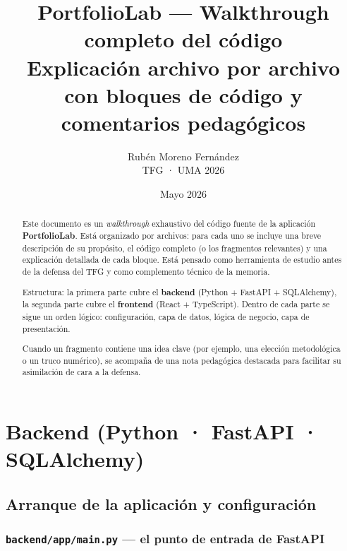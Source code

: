 \documentclass[11pt,a4paper]{book}
\title{\textbf{PortfolioLab — Walkthrough completo del código}\\[0.4em]
       \large Explicación archivo por archivo\\
       \small con bloques de código y comentarios pedagógicos}
\author{Rubén Moreno Fernández\\\small TFG · UMA 2026}
\date{Mayo 2026}
\begin{document}
\frontmatter
\maketitle

\begin{abstract}
\noindent Este documento es un \emph{walkthrough} exhaustivo del código fuente de la aplicación \textbf{PortfolioLab}. Está organizado por archivos: para cada uno se incluye una breve descripción de su propósito, el código completo (o los fragmentos relevantes) y una explicación detallada de cada bloque. Está pensado como herramienta de estudio antes de la defensa del TFG y como complemento técnico de la memoria.

\medskip

Estructura: la primera parte cubre el \textbf{backend} (Python + FastAPI + SQLAlchemy), la segunda parte cubre el \textbf{frontend} (React + TypeScript). Dentro de cada parte se sigue un orden lógico: configuración, capa de datos, lógica de negocio, capa de presentación.

\medskip

Cuando un fragmento contiene una idea clave (por ejemplo, una elección metodológica o un truco numérico), se acompaña de una nota pedagógica destacada para facilitar su asimilación de cara a la defensa.
\end{abstract}

\tableofcontents

\mainmatter

\part{Backend (Python · FastAPI · SQLAlchemy)}

\chapter{Arranque de la aplicación y configuración}

\section{\texttt{backend/app/main.py} --- el punto de entrada de FastAPI}
\end{document}
